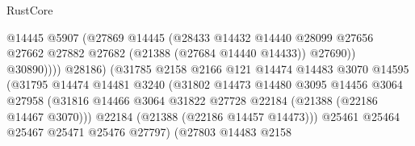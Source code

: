 \begin{lexlean}{RustCore}
\begin{coremodule}
                                            @14445
                                            @5907
                                            (@27869
                                              @14445
                                              (@28433
                                                @14432
                                                @14440
                                                @28099
                                                @27656
                                                @27662
                                                @27882
                                                @27682
                                                (@21388 (@27684 @14440 @14433))
                                                @27690))
                                            @30890))))
                                    @28186)
                                  (@31785
                                    @2158
                                    @2166
                                    @121
                                    @14474
                                    @14483
                                    @3070
                                    @14595
                                    (@31795
                                      @14474
                                      @14481
                                      @3240
                                      (@31802
                                        @14473
                                        @14480
                                        @3095
                                        @14456
                                        @3064
                                        @27958
                                        (@31816
                                          @14466
                                          @3064
                                          @31822
                                          @27728
                                          @22184
                                          (@21388 (@22186 @14467 @3070)))
                                        @22184
                                        (@21388 (@22186 @14457 @14473)))
                                      @25461
                                      @25464
                                      @25467
                                      @25471
                                      @25476
                                      @27797)
                                    (@27803
                                      @14483
                                      @2158

\end{coremodule}
\end{lexlean}
